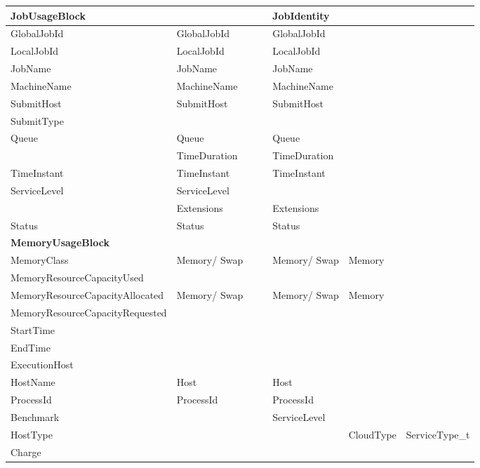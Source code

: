 \begin{longtable}{ | p{} | p{} | p{} | p{} | p{} | p{} | p{} | }
\textbf{Job\-Usage\-Block}& 			& 			&			& \textbf{Job\-Identity}& 						& \\ \hline
GlobalJobId		& GlobalJobId		& 			&			& GlobalJobId		& 						& \\ \hline
LocalJobId		& LocalJobId		& 			&			& LocalJobId		& 						& \\ \hline
JobName			& JobName		& 			&			& JobName		& 						& \\ \hline
Machine\-Name		& Machine\-Name		& 			&			& Machine\-Name		& 						& \\ \hline
SubmitHost		& SubmitHost		& 			&			& SubmitHost		& 						& \\ \hline
SubmitType		& 			& 			&			& 			& 						& \\ \hline
Queue			& Queue			& 			&			& Queue			& 						& \\ \hline
			& Time\-Duration	& 			&			& Time\-Duration	& 						& \\ \hline
TimeInstant		& TimeInstant		& 			&			& TimeInstant		& 						& \\ \hline
ServiceLevel		& ServiceLevel		& 			&			& 			& 						& \\ \hline
			& Extensions		& 			&			& Extensions		& 					& \\
\hline
Status			& Status		& 			&			& Status		& 						& \\ \hline\hline






\textbf{Memory\-Usage\-Block}&			&			&			&			&						& \\ \hline
Memory\-Class		& Memory/ Swap		& 			&			& Memory/ Swap		& Memory					& \\ \hline
Memory\-Resource\-Capacity\-Used& 		&			& 			& 			&						& \\ \hline
Memory\-Resource\-Capacity\-Allocated& Memory/ Swap	& 			&			& Memory/ Swap		& Memory					& \\ \hline
Memory\-Resource\-Capacity\-Requested& 		& 			&			& 			& 						& \\ \hline
StartTime		& 			& 			&			& 			& 						& \\ \hline
EndTime			& 			& 			&			& 			& 						& \\ \hline
Execution\-Host			& 			& 			&			& 			& 						& \\ \hline
HostName		& Host			&			&			& Host			& 						& \\ \hline
ProcessId		& ProcessId		& 			&			& ProcessId		& 						& \\ \hline
Benchmark               &			&                       &                       & ServiceLevel		&                                               & \\ \hline
HostType		& 			& 			&			& 			& CloudType					& ServiceType\_t\\ \hline
Charge			& 			& 			&			& 			& 						& \\ \hline\hline




\end{longtable}
